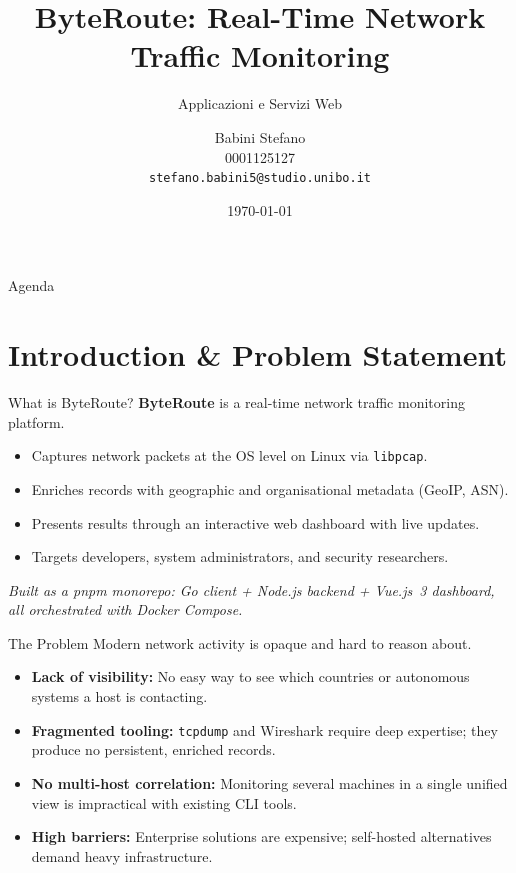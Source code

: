 \documentclass[aspectratio=169]{beamer}
\title[ByteRoute]{ByteRoute: Real-Time Network Traffic Monitoring}
\subtitle{Applicazioni e Servizi Web}
\author[Babini Stefano]{
    Babini Stefano \\
    \small 0001125127 \\
    \footnotesize \texttt{stefano.babini5@studio.unibo.it}
}
\institute[Unibo]{University of Bologna}
\date{\today}
\begin{document}
\begin{frame}
    \titlepage
\end{frame}

\begin{frame}{Agenda}
    \tableofcontents
\end{frame}

\section{Introduction \& Problem Statement}

\begin{frame}{What is ByteRoute?}
    \textbf{ByteRoute} is a real-time network traffic monitoring platform.
    \vspace{0.4cm}
    \begin{itemize}
        \item Captures network packets at the OS level on Linux via \texttt{libpcap}.
        \item Enriches records with geographic and organisational metadata (GeoIP, ASN).
        \item Presents results through an interactive web dashboard with live updates.
        \item Targets developers, system administrators, and security researchers.
    \end{itemize}
    \vspace{0.4cm}
    \textit{Built as a pnpm monorepo: Go client + Node.js backend + Vue.js~3 dashboard,
    all orchestrated with Docker Compose.}
\end{frame}

\begin{frame}{The Problem}
    Modern network activity is opaque and hard to reason about.
    \vspace{0.4cm}
    \begin{itemize}
        \item \textbf{Lack of visibility:} No easy way to see which countries or autonomous
              systems a host is contacting.
        \item \textbf{Fragmented tooling:} \texttt{tcpdump} and Wireshark require deep
              expertise; they produce no persistent, enriched records.
        \item \textbf{No multi-host correlation:} Monitoring several machines in a single
              unified view is impractical with existing CLI tools.
        \item \textbf{High barriers:} Enterprise solutions are expensive; self-hosted
              alternatives demand heavy infrastructure.
    \end{itemize}
\end{frame}
\end{document}
